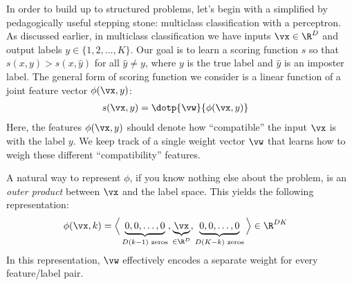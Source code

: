 
In order to build up to structured problems, let's begin with a simplified by pedagogically useful stepping stone: multiclass classification with a perceptron.
As discussed earlier, in multiclass classification we have inputs $\vx \in \R^D$ and output labels $y \in \{ 1, 2, \dots, K \}$.
Our goal is to learn a scoring function $s$ so that $s(x,y) > s(x,\hat y)$ for all $\hat y \neq y$, where $y$ is the true label and $\hat y$ is an imposter label.
The general form of scoring function we consider is a linear function of a joint feature vector $\phi(\vx,y)$:
%
\begin{align}
s(\vx,y) &= \dotp{\vw}{\phi(\vx,y)}
\end{align}
%
Here, the features $\phi(\vx,y)$ should denote how ``compatible'' the input $\vx$ is with the label $y$.
We keep track of a single weight vector $\vw$ that learns how to weigh these different ``compatibility'' features.

A natural way to represent $\phi$, if you know nothing else about the problem, is an \emph{outer product} between $\vx$ and the label space.
This yields the following representation:
\begin{align}
  \phi(\vx,k) &= \Big\langle
                \underbrace{0, 0, \dots, 0}_{D(k-1) \text{ zeros}},
                \underbrace{\vx}_{\in \R^D},
                \underbrace{0, 0, \dots, 0}_{D(K-k) \text{ zeros}}
                \Big\rangle \in \R^{DK} \label{eq:defphi}
\end{align}
%
In this representation, $\vw$ effectively encodes a separate weight for every feature/label pair.

